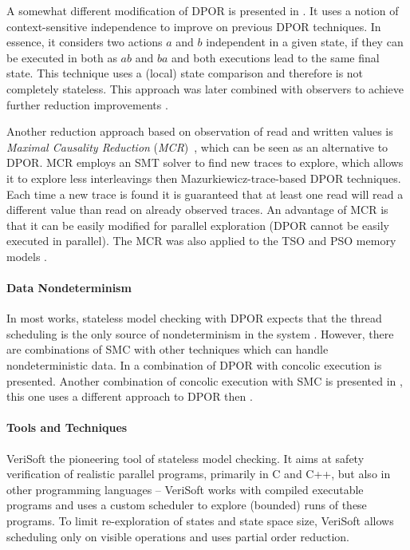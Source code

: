 A somewhat different modification of DPOR is presented in .
It uses a notion of context-sensitive independence to improve on previous DPOR techniques.
In essence, it considers two actions $a$ and $b$ independent in a given state, if they can be executed in both as $ab$ and $ba$ and both executions lead to the same final state.
This technique uses a (local) state comparison and therefore is not completely stateless.
This approach was later combined with observers to achieve further reduction improvements .

Another reduction approach based on observation of read and written values is
\emph{Maximal Causality Reduction} (\emph{MCR})~, which can be
seen as an alternative to DPOR.
MCR employs an SMT solver to find new traces to explore, which allows it to
explore less interleavings then Mazurkiewicz-trace-based DPOR techniques.
Each time a new trace is found it is guaranteed that at least one read will read a different value than read on already observed traces.
An advantage of MCR is that it can be easily modified for parallel
exploration (DPOR cannot be easily executed in parallel).
The MCR was also applied to the TSO and PSO memory models .


\paragraph{Data Nondeterminism}

In most works, stateless model checking with DPOR expects that the thread
scheduling is the only source of nondeterminism in the system .
However, there are combinations of SMC with other techniques which can handle
nondeterministic data.
In  a combination of DPOR with concolic execution is presented.
Another combination of concolic execution with SMC is presented in , this one uses a different approach to DPOR then .

\paragraph{Tools and Techniques}

VeriSoft  the pioneering tool of stateless model checking.
It aims at safety verification of realistic parallel programs, primarily in C and C++, but also in other programming languages -- VeriSoft works with compiled executable programs and uses a custom scheduler to explore (bounded) runs of these programs.
To limit re-exploration of states and state space size, VeriSoft allows scheduling only on visible operations and uses partial order reduction.

